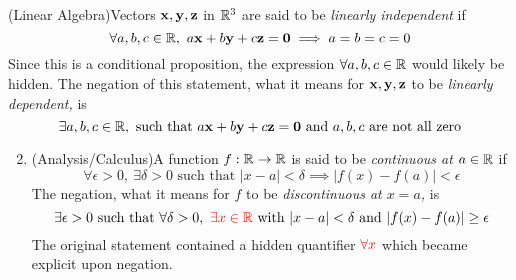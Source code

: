 \begin{examples}{}{}
	\exstart (Linear Algebra)\lstsp Vectors ${\mathbf{x}},{\mathbf{y}},{\mathbf{z}}$ in $\mathbb{R}^3$ are said to be \emph{linearly independent} if
	\[
		\forall a,b,c\in\R,\ a\vx+b\vy+c\vz=\V0\implies a=b=c=0
	\]
	Since this is a conditional proposition, the expression $\forall a,b,c\in\mathbb{R}$ would likely be hidden. The negation of this statement, what it means for ${\mathbf{x}},{\mathbf{y}},{\mathbf{z}}$ to be \emph{linearly dependent,} is
	\[
		\exists a,b,c\in\mathbb{R},\text{ such that }a{\mathbf{x}}+b{\mathbf{y}}+c{\mathbf{z}}=\mathbf{0}\text{ and $a,b,c$ are not all zero}
	\]
	\begin{enumerate}\setcounter{enumi}{1}
	  \item (Analysis/Calculus)\lstsp A function $f:\mathbb{R}\to\mathbb{R}$ is said to be \emph{continuous at $a\in\mathbb{R}$} if
		\[
			\forall\epsilon >0,\ \exists\delta>0\text{ such that }|x-a|<\delta\implies |f(x)-f(a)|<\epsilon
		\]
		The negation, what it means for $f$ to be \emph{discontinuous at $x=a$,} is
		\[
			\exists\epsilon>0\text{ such that }\forall\delta>0,\ \textcolor{red}{\exists x\in\mathbb{R}}\text{ with }|x-a|<\delta\text{ and }|f(x)-f(a)|\ge\epsilon
		\]
		The original statement contained a hidden quantifier $\textcolor{red}{\forall x}$ which became explicit upon negation.
	\end{enumerate}
\end{examples}



